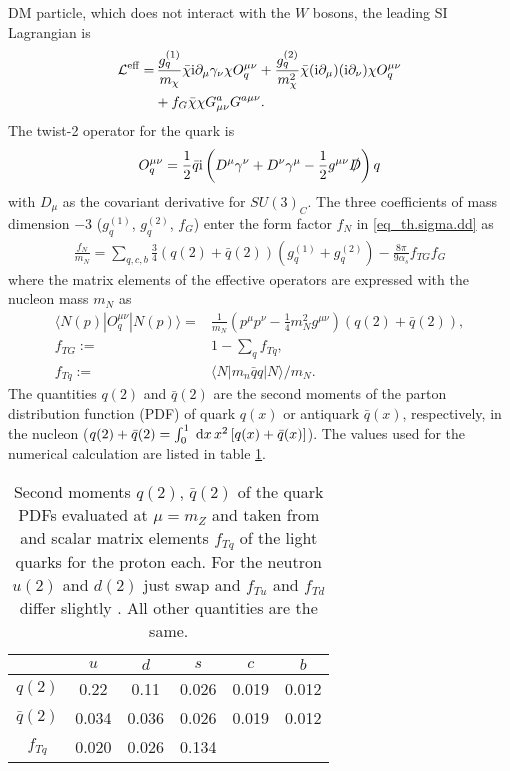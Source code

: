 DM particle, which does not interact with the $W$ bosons, the leading SI Lagrangian is
\begin{align}
 \mathcal{L}^\text{eff} =&\, \frac{g_q^{(1)}}{m_\chi} \bar \chi\text{i} \partial_\mu \gamma_\nu\chi O_q^{\mu\nu} + \frac{g_q^{(2)}}{m^2_\chi} \bar \chi(\text{i} \partial_\mu) (\text{i}\partial_\nu)\chi O_q^{\mu\nu} \\
 \nonumber
 &+ f_G \bar \chi \chi G^a_{\mu\nu} G^{a\mu\nu}.
\end{align}
The twist-2 operator for the quark is
\begin{align}
 O_q^{\mu\nu} = \frac12 \bar q \text{i} \left(D^\mu \gamma^\nu + D^\nu \gamma^\mu - \frac12 g^{\mu\nu} \slashed{D}\right) q
\end{align}
with $D_\mu$ as the covariant derivative for $SU(3)_C$. The three coefficients of mass dimension $-3$ ($g_q^{(1)}$, $g_q^{(2)}$, $f_G$) enter 
the form factor $f_N$ in \eqref{eq_th.sigma.dd} as
\begin{align}
 \frac{f_N}{m_N} = \sum\limits_{q,c,b} \frac34 \left(q(2)+\bar q(2)\right) \left(g_q^{(1)} + g_q^{(2)}\right) - \frac{8\pi}{9\alpha_s}f_{TG}f_G
 \label{eq_ddformfactorA}
\end{align}
where the matrix elements of the effective operators are expressed with the nucleon mass $m_N$ as \cite{1007.2601}
\begin{subequations}
\begin{align}
 \langle N(p)| O_q^{\mu\nu} | N(p)\rangle =& \frac{1}{m_N}\left(p^\mu p^\nu - \frac14 m_N^2 g^{\mu\nu}\right) \left(q(2) + \bar q(2)\right),\\
 f_{TG} :=& 1- \sum\limits_q f_{Tq},\\
 f_{Tq} :=& \langle N|m_n \bar qq |N\rangle /m_N.
\end{align}
\end{subequations}
The quantities $q(2)$ and $\bar q(2)$ are the second moments \cite{0811.1779} of the parton distribution function (PDF) of quark $q(x)$ or antiquark 
$\bar q(x)$, respectively, in the nucleon ($q(2)+\bar q(2) = \int_0^1 \; \mathrm{d} x\, x^2 \left[q(x) + \bar q(x)\right]$). The values used for the numerical
calculation are listed in table \ref{tab_parton}.
\begin{table}[b]
 \begin{tabular}{c|ccccc}
   & $u$ & $d$ & $s$ & $c$ &$b$ \\
   \hline
  $q(2)$ & 0.22 & 0.11 & 0.026 & 0.019 & 0.012\\
  $\bar q(2)$ & 0.034 & 0.036 & 0.026 & 0.019 & 0.012\\
  $f_{Tq}$ & 0.020& 0.026 &\hspace{0.47cm}  0.134\cite{1209.3641}\\
 \end{tabular}
\caption{Second moments $q(2)$, $\bar q(2)$ of the quark PDFs evaluated at $\mu=m_Z$ and taken from \cite{0201195} and scalar matrix elements $f_{Tq}$ of 
the light quarks for the 
proton each. For the neutron $u(2)$ and $d(2)$ just swap and $f_{Tu}$ and $f_{Td}$ differ slightly \cite{9506380}. All other quantities are the same. }
\label{tab_parton}
\end{table}
